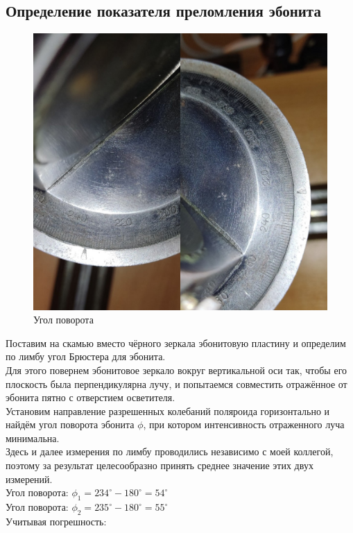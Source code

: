 \documentclass[a4paper]{article}
\begin{document}
\subsection{Определение показателя преломления эбонита}
\begin{figure}
	\includegraphics[width=\linewidth]{g2}
	\caption{Угол поворота}
	\label{ris 4.2}
\end{figure}
Поставим на скамью вместо чёрного зеркала эбонитовую
пластину и определим по лимбу угол Брюстера для эбонита. \\
Для этого повернем эбонитовое зеркало вокруг вертикальной оси так, чтобы его плоскость была перпендикулярна лучу, и попытаемся совместить отражённое от эбонита пятно с отверстием осветителя. \\
Установим направление разрешенных колебаний поляроида горизонтально и найдём угол поворота эбонита $\phi$, при котором интенсивность отраженного луча минимальна.\\
Здесь и далее измерения по лимбу проводились независимо с моей коллегой, поэтому за результат целесообразно принять среднее значение этих двух измерений.\\
Угол поворота: $\phi_1 = 234^{\circ} - 180^{\circ} = 54^{\circ}$\\
Угол поворота: $\phi_2 = 235^{\circ} - 180^{\circ} = 55^{\circ}$\\
Учитывая погрешность:\\
\end{document}
